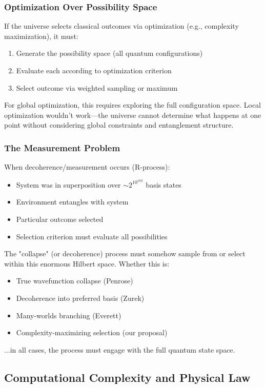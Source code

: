 \subsubsection{Optimization Over Possibility Space}

If the universe selects classical outcomes via optimization (e.g., complexity maximization), it must:
\begin{enumerate}
\item Generate the possibility space (all quantum configurations)
\item Evaluate each according to optimization criterion
\item Select outcome via weighted sampling or maximum
\end{enumerate}

For global optimization, this requires exploring the full configuration space. Local optimization wouldn't work—the universe cannot determine what happens at one point without considering global constraints and entanglement structure.

\subsubsection{The Measurement Problem}

When decoherence/measurement occurs (R-process):
\begin{itemize}
\item System was in superposition over $\sim 2^{10^{183}}$ basis states
\item Environment entangles with system
\item Particular outcome selected
\item Selection criterion must evaluate all possibilities
\end{itemize}

The "collapse" (or decoherence) process must somehow sample from or select within this enormous Hilbert space. Whether this is:
\begin{itemize}
\item True wavefunction collapse (Penrose)
\item Decoherence into preferred basis (Zurek)
\item Many-worlds branching (Everett)
\item Complexity-maximizing selection (our proposal)
\end{itemize}
...in all cases, the process must engage with the full quantum state space.

\subsection{Computational Complexity and Physical Law}

